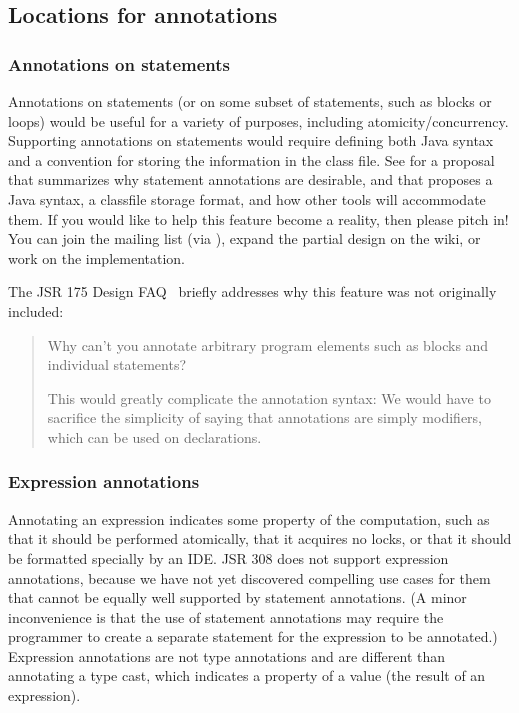 \documentclass[10pt]{article}
\begin{document}
\subsection{Locations for annotations}


\subsubsection{Annotations on statements\label{statement-annotations}}

Annotations on statements (or on some subset of statements, such as blocks
or loops) would be useful for a variety of purposes, including
atomicity/concurrency.  Supporting annotations on statements would require
defining both Java syntax and a convention for storing the information in
the class file.  See
 for a
proposal that summarizes why statement annotations are desirable, and that
proposes a Java syntax, a classfile storage format, and how other tools
will accommodate them.  If you would like to help this feature become a
reality, then please pitch in!  You can join the
 mailing list (via
),
expand the partial design on the wiki, or work on the implementation.


The JSR 175 Design FAQ~\cite{JSR175-PFD2} briefly addresses why this
feature was not originally included:

\begin{quote}
  Why can't you annotate arbitrary program elements such as blocks
    and individual statements?

  This would greatly complicate the annotation syntax: We would have to
  sacrifice the simplicity of saying that annotations are simply modifiers,
  which can be used on declarations.
\end{quote}


\subsubsection{Expression annotations\label{expression-annotations}}

Annotating an expression
indicates some property of the computation, such as that it should
be performed atomically, that it acquires no locks, or that it should be
formatted specially by an IDE\@.  JSR 308 does not support expression
annotations, because we have not yet discovered compelling use cases for
them that cannot be equally well supported by statement annotations.  (A
minor inconvenience is that the use of statement annotations may require
the programmer to create a separate statement for the expression to be
annotated.)
Expression annotations are not type annotations and are different than
annotating a type cast, which indicates a property of a value (the result
of an expression).
\end{document}
